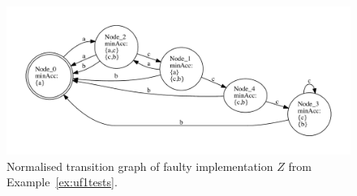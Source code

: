  \begin{figure}
 \begin{center}
\includegraphics[width=\textwidth]{z_acc.pdf}
\end{center}
\caption{Normalised transition graph of faulty implementation $Z$  from Example~\ref{ex:uf1tests}.}
 \label{fig:tgZ}
 \end{figure}



